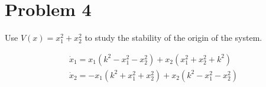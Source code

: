 \section{Problem 4}

Use $V(x) = x_1^2 + x_2^2$ to study the stability of the origin of the system.

$$
\begin{array}{l}
\dot{x}_{1}=x_{1}\left(k^{2}-x_{1}^{2}-x_{2}^{2}\right)+x_{2}\left(x_{1}^{2}+x_{2}^{2}+k^{2}\right) \\
\dot{x}_{2}=-x_{1}\left(k^{2}+x_{1}^{2}+x_{2}^{2}\right)+x_{2}\left(k^{2}-x_{1}^{2}-x_{2}^{2}\right)
\end{array}
$$
